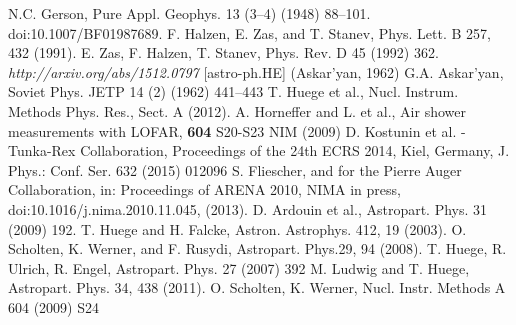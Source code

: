 \begin{thebibliography}{1}
 N.C. Gerson, Pure Appl. Geophys. 13 (3–4) (1948) 88–101. doi:10.1007/BF01987689.
F. Halzen, E. Zas, and T. Stanev, Phys. Lett. B 257, 432 (1991).
 E. Zas, F. Halzen, T. Stanev, Phys. Rev. D 45 (1992) 362.
 \emph{http://arxiv.org/abs/1512.0797} [astro-ph.HE]
 (Askar’yan, 1962) G.A. Askar’yan, Soviet Phys. JETP 14 (2) (1962) 441–443
 T. Huege et al., Nucl. Instrum. Methods Phys. Res., Sect.
A (2012).
 A. Horneffer and L. et al., Air shower measurements with LOFAR, \textbf{604} S20-S23 NIM (2009)
 D. Kostunin et al. - Tunka-Rex Collaboration, Proceedings of the 24th ECRS 2014, Kiel, Germany, J. Phys.: Conf. Ser. 632 (2015) 012096 
 S. Fliescher, and for the Pierre Auger Collaboration, in: Proceedings of ARENA 2010, NIMA in press, doi:10.1016/j.nima.2010.11.045, (2013).
 D. Ardouin et al., Astropart. Phys. 31 (2009) 192.
 T. Huege and H. Falcke, Astron. Astrophys. 412, 19 (2003).
 O. Scholten, K. Werner, and F. Rusydi, Astropart. Phys.29, 94 (2008).
 T. Huege, R. Ulrich, R. Engel, Astropart. Phys. 27 (2007) 392
 M. Ludwig and T. Huege, Astropart. Phys. 34, 438 (2011).
 O. Scholten, K. Werner, Nucl. Instr. Methods A 604 (2009) S24
\end{thebibliography}